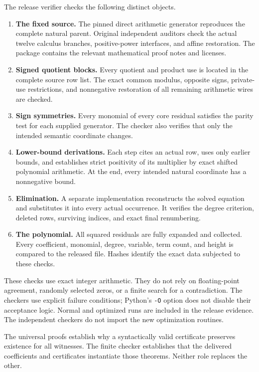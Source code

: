 \documentclass[11pt,letterpaper]{article}
\theoremstyle{definition}
\begin{document}
The release verifier checks the following distinct objects.
\begin{enumerate}
\item \textbf{The fixed source.} The pinned direct arithmetic generator
    reproduces the complete natural parent. Original independent
    auditors check the actual twelve calculus branches, positive-power
    interfaces, and affine restoration. The package contains the
    relevant mathematical proof notes and licenses.
\item \textbf{Signed quotient blocks.} Every quotient and product use
    is located in the complete source row list. The exact common
    modulus, opposite signs, private-use restrictions, and nonnegative
    restoration of all remaining arithmetic wires are checked.
\item \textbf{Sign symmetries.} Every monomial of every core residual
    satisfies the parity test for each supplied generator. The checker
    also verifies that only the intended semantic coordinate changes.
\item \textbf{Lower-bound derivations.} Each step cites an actual row,
    uses only earlier bounds, and establishes strict positivity of its
    multiplier by exact shifted polynomial arithmetic. At the end,
    every intended natural coordinate has a nonnegative bound.
\item \textbf{Elimination.} A separate implementation reconstructs the
    solved equation and substitutes it into every actual occurrence.
    It verifies the degree criterion, deleted rows, surviving indices,
    and exact final renumbering.
\item \textbf{The polynomial.} All squared residuals are fully expanded
    and collected. Every coefficient, monomial, degree, variable, term
    count, and height is compared to the released file. Hashes identify
    the exact data subjected to these checks.
\end{enumerate}

These checks use exact integer arithmetic. They do not rely on
floating-point agreement, randomly selected zeros, or a finite search
for a contradiction. The checkers use explicit failure conditions;
Python's \texttt{-O} option does not disable their acceptance logic.
Normal and optimized runs are included in the release evidence. The
independent checkers do not import the new optimization routines.

The universal proofs establish why a syntactically valid certificate
preserves existence for all witnesses. The finite checker establishes
that the delivered coefficients and certificates instantiate those
theorems. Neither role replaces the other.
\end{document}
